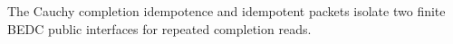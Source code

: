 The Cauchy completion idempotence and idempotent packets isolate two finite
BEDC public interfaces for repeated completion reads.



